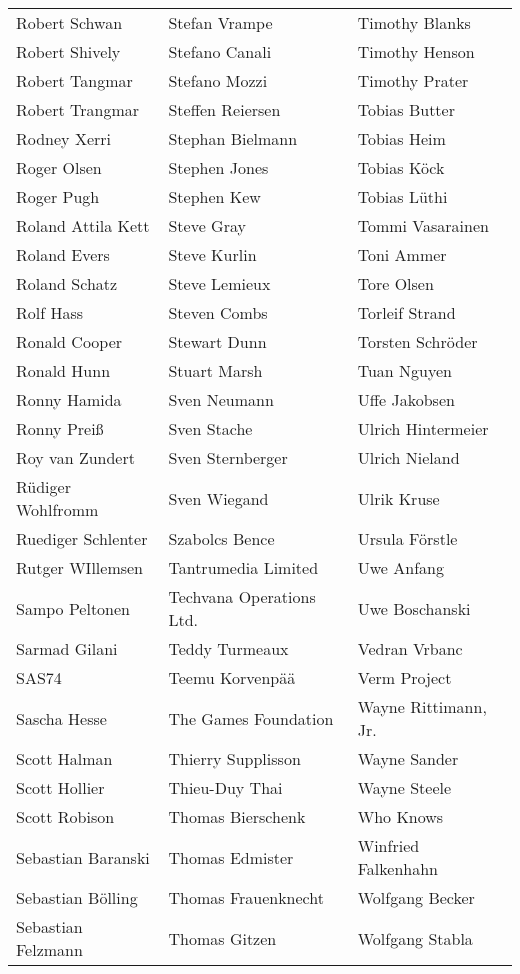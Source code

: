 \begin{small}
\begin{tabular}{p{4cm}p{4cm}p{4cm}}
Robert Schwan & Stefan Vrampe & Timothy Blanks \\
Robert Shively & Stefano Canali & Timothy Henson \\
Robert Tangmar & Stefano Mozzi & Timothy Prater \\
Robert Trangmar & Steffen Reiersen & Tobias Butter \\
Rodney Xerri & Stephan Bielmann & Tobias Heim \\
Roger Olsen & Stephen Jones & Tobias Köck \\
Roger Pugh & Stephen Kew & Tobias Lüthi \\
Roland Attila Kett & Steve Gray & Tommi Vasarainen \\
Roland Evers & Steve Kurlin & Toni Ammer \\
Roland Schatz & Steve Lemieux & Tore Olsen \\
Rolf Hass & Steven Combs & Torleif Strand \\
Ronald Cooper & Stewart Dunn & Torsten Schröder \\
Ronald Hunn & Stuart Marsh & Tuan Nguyen \\
Ronny Hamida & Sven Neumann & Uffe Jakobsen \\
Ronny Preiß & Sven Stache & Ulrich Hintermeier \\
Roy van Zundert & Sven Sternberger & Ulrich Nieland \\
Rüdiger Wohlfromm & Sven Wiegand & Ulrik Kruse \\
Ruediger Schlenter & Szabolcs Bence & Ursula Förstle \\
Rutger WIllemsen & Tantrumedia Limited & Uwe Anfang \\
Sampo Peltonen & Techvana Operations Ltd. & Uwe Boschanski \\
Sarmad Gilani & Teddy Turmeaux & Vedran Vrbanc \\
SAS74 & Teemu Korvenpää & Verm Project \\
Sascha Hesse & The Games Foundation & Wayne Rittimann, Jr. \\
Scott Halman & Thierry Supplisson & Wayne Sander \\
Scott Hollier & Thieu-Duy Thai & Wayne Steele \\
Scott Robison & Thomas Bierschenk & Who Knows \\
Sebastian Baranski & Thomas Edmister & Winfried Falkenhahn \\
Sebastian Bölling & Thomas Frauenknecht & Wolfgang Becker \\
Sebastian Felzmann & Thomas Gitzen & Wolfgang Stabla \\

\end{tabular}
\end{small}
